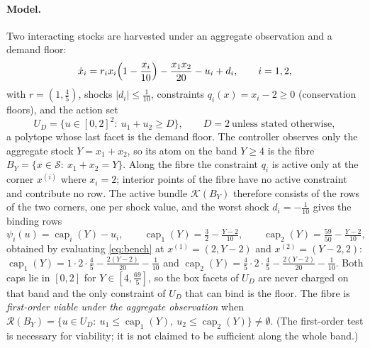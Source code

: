 \documentclass[11pt,a4paper]{article}
\theoremstyle{plain}
\theoremstyle{definition}
\theoremstyle{remark}
\newcommand{\calK}{\mathcal{K}}
\newcommand{\calR}{\mathcal{R}}
\newcommand{\calS}{\mathcal{S}}
\newcommand{\capi}[1]{\operatorname{cap}_{#1}}
\newcommand{\tfr}[2]{\tfrac{#1}{#2}}
\begin{document}
\paragraph{Model.} Two interacting stocks are harvested under an aggregate observation and a demand floor:
\begin{equation}\label{eq:bench}
\dot x_i=r_ix_i\Bigl(1-\frac{x_i}{10}\Bigr)-\frac{x_1x_2}{20}-u_i+d_i,\qquad i=1,2,
\end{equation}
with $r=(1,\tfr45)$, shocks $|d_i|\le\tfr1{10}$, constraints $q_i(x)=x_i-2\ge0$ (conservation floors), and the action set
\begin{equation}\label{eq:benchU}
U_D=\bigl\{u\in[0,2]^2:\ u_1+u_2\ge D\bigr\},\qquad D=2\ \text{unless stated otherwise},
\end{equation}
a polytope whose last facet is the demand floor. The controller observes only the aggregate stock $Y=x_1+x_2$, so its atom on the band $Y\ge4$ is the fibre $B_Y=\{x\in\calS:\ x_1+x_2=Y\}$. Along the fibre the constraint $q_i$ is active only at the corner $x^{(i)}$ where $x_i=2$; interior points of the fibre have no active constraint and contribute no row. The active bundle $\calK(B_Y)$ therefore consists of the rows of the two corners, one per shock value, and the worst shock $d_i=-\tfr1{10}$ gives the binding rows
\begin{equation}\label{eq:caps}
\psi_i(u)=\capi{i}(Y)-u_i,\qquad \capi{1}(Y)=\tfr32-\tfr{Y-2}{10},\qquad \capi{2}(Y)=\tfr{59}{50}-\tfr{Y-2}{10},
\end{equation}
obtained by evaluating \eqref{eq:bench} at $x^{(1)}=(2,Y-2)$ and $x^{(2)}=(Y-2,2)$: $\capi{1}(Y)=1\cdot2\cdot\tfr45-\tfr{2(Y-2)}{20}-\tfr1{10}$ and $\capi{2}(Y)=\tfr45\cdot2\cdot\tfr45-\tfr{2(Y-2)}{20}-\tfr1{10}$. Both caps lie in $[0,2]$ for $Y\in[4,\tfr{69}5]$, so the box facets of $U_D$ are never charged on that band and the only constraint of $U_D$ that can bind is the floor. The fibre is \emph{first-order viable under the aggregate observation} when $\calR(B_Y)=\{u\in U_D:\ u_1\le\capi{1}(Y),\ u_2\le\capi{2}(Y)\}\neq\emptyset$. (The first-order test is necessary for viability; it is not claimed to be sufficient along the whole band.)
\end{document}
